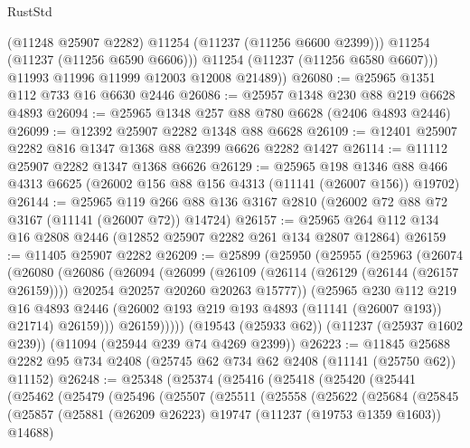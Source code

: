 \begin{lexlean}{RustStd}
\begin{coremodule}
              (@11248 @25907 @2282)
              @11254
              (@11237 (@11256 @6600 @2399)))
            @11254
            (@11237 (@11256 @6590 @6606)))
          @11254
          (@11237 (@11256 @6580 @6607)))
        @11993
        @11996
        @11999
        @12003
        @12008
        @21489))
@26080 := @25965 @1351 @112 @733 @16 @6630 @2446
@26086 := @25957 @1348 @230 @88 @219 @6628 @4893
@26094 := @25965 @1348 @257 @88 @780 @6628 (@2406 @4893 @2446)
@26099 := @12392 @25907 @2282 @1348 @88 @6628
@26109 := @12401 @25907 @2282 @816 @1347 @1368 @88 @2399 @6626 @2282 @1427
@26114 := @11112 @25907 @2282 @1347 @1368 @6626
@26129 := @25965
    @198
    @1346
    @88
    @466
    @4313
    @6625
    (@26002 @156 @88 @156 @4313 (@11141 (@26007 @156)) @19702)
@26144 := @25965
    @119
    @266
    @88
    @136
    @3167
    @2810
    (@26002 @72 @88 @72 @3167 (@11141 (@26007 @72)) @14724)
@26157 := @25965 @264 @112 @134 @16 @2808 @2446 (@12852 @25907 @2282 @261 @134 @2807 @12864)
@26159 := @11405 @25907 @2282
@26209 := @25899
    (@25950
      (@25955
        (@25963
          (@26074
            (@26080
              (@26086
                (@26094
                  (@26099
                    (@26109
                      (@26114 (@26129 (@26144 (@26157 @26159))))
                      @20254
                      @20257
                      @20260
                      @20263
                      @15777))
                  (@25965
                    @230
                    @112
                    @219
                    @16
                    @4893
                    @2446
                    (@26002 @193 @219 @193 @4893 (@11141 (@26007 @193)) @21714)
                    @26159)))
              @26159)))))
    (@19543 (@25933 @62))
    (@11237 (@25937 @1602 @239))
    (@11094 (@25944 @239 @74 @4269 @2399))
@26223 := @11845
    @25688
    @2282
    @95
    @734
    @2408
    (@25745 @62 @734 @62 @2408 (@11141 (@25750 @62)) @11152)
@26248 := @25348
    (@25374
      (@25416
        (@25418
          (@25420
            (@25441
              (@25462
                (@25479
                  (@25496
                    (@25507
                      (@25511
                        (@25558
                          (@25622
                            (@25684
                              (@25845
                                (@25857
                                  (@25881
                                    (@26209 @26223)
                                    @19747
                                    (@11237 (@19753 @1359 @1603))
                                    @14688)

\end{coremodule}
\end{lexlean}
